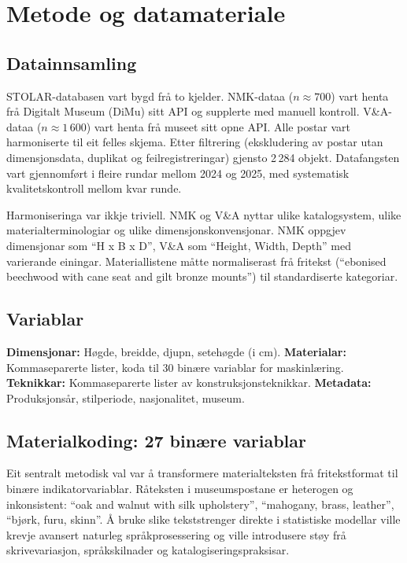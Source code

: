 \documentclass[10pt, a4paper, twocolumn]{article}
\begin{document}
\section{Metode og datamateriale}

\subsection{Datainnsamling}

STOLAR-databasen vart bygd frå to kjelder. NMK-dataa ($n \approx 700$) vart henta frå Digitalt Museum (DiMu) sitt API og supplerte med manuell kontroll. V\&A-dataa ($n \approx 1\,600$) vart henta frå museet sitt opne API. Alle postar vart harmoniserte til eit felles skjema. Etter filtrering (ekskludering av postar utan dimensjonsdata, duplikat og feilregistreringar) gjensto 2\,284 objekt. Datafangsten vart gjennomført i fleire rundar mellom 2024 og 2025, med systematisk kvalitetskontroll mellom kvar runde.

Harmoniseringa var ikkje triviell. NMK og V\&A nyttar ulike katalogsystem, ulike materialterminologiar og ulike dimensjonskonvensjonar. NMK oppgjev dimensjonar som ``H x B x D'', V\&A som ``Height, Width, Depth'' med varierande einingar. Materiallistene måtte normaliserast frå fritekst (``ebonised beechwood with cane seat and gilt bronze mounts'') til standardiserte kategoriar.

\subsection{Variablar}

\textbf{Dimensjonar:} Høgde, breidde, djupn, setehøgde (i cm). \textbf{Materialar:} Kommaseparerte lister, koda til 30 binære variablar for maskinlæring. \textbf{Teknikkar:} Kommaseparerte lister av konstruksjonsteknikkar. \textbf{Metadata:} Produksjonsår, stilperiode, nasjonalitet, museum.

\subsection{Materialkoding: 27 binære variablar}

Eit sentralt metodisk val var å transformere materialteksten frå fritekstformat til binære indikatorvariablar. Råteksten i museumspostane er heterogen og inkonsistent: ``oak and walnut with silk upholstery'', ``mahogany, brass, leather'', ``bjørk, furu, skinn''. Å bruke slike tekststrenger direkte i statistiske modellar ville krevje avansert naturleg språkprosessering og ville introdusere støy frå skrivevariasjon, språkskilnader og katalogiseringspraksisar.
\end{document}

